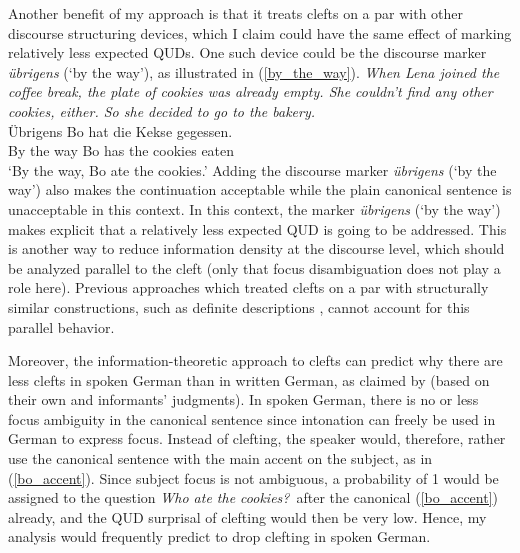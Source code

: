 \documentclass[output=paper,colorlinks,citecolor=brown]{langscibook}
\begin{document}
Another benefit of my approach is that it treats clefts on a par with other discourse structuring devices, which I claim could have the same effect of marking relatively less expected QUDs. One such device could be the discourse marker \textit{übrigens} (`by the way'), as illustrated in (\ref{by_the_way}).
\ea\label{by_the_way} \textit{When Lena joined the coffee break, the plate of cookies was already empty. She couldn't find any other cookies, either. So she decided to go to the bakery.}\\\vspace{1ex}
\gll Übrigens Bo hat die Kekse gegessen.\\
{By the way} Bo has the cookies eaten\\
\glt `By the way, Bo ate the cookies.'
\z
\largerpage
Adding the discourse marker \textit{übrigens} (`by the way') also makes the continuation acceptable while the plain canonical sentence is unacceptable in this context. In this context, the marker \textit{übrigens} (`by the way') makes explicit that a relatively less expected QUD is going to be addressed. This is another way to reduce information density at the discourse level, which should be analyzed parallel to the cleft (only that focus disambiguation does not play a role here). Previous approaches which treated clefts on a par with structurally similar constructions, such as definite descriptions \citep{percus_1997}, cannot account for this parallel behavior.

Moreover, the information-theoretic approach to clefts can predict why there are less clefts in spoken German than in written German, as claimed by \citet{tonnis_et_al_2018} (based on their own and informants' judgments). In spoken German, there is no or less focus ambiguity in the canonical sentence since intonation can freely be used in German to express focus. Instead of clefting, the speaker would, therefore, rather use the canonical sentence with the main accent on the subject, as in (\ref{bo_accent}).
\z
%
Since subject focus is not ambiguous, a probability of 1 would be assigned to the question \textit{Who ate the cookies?}~after the canonical (\ref{bo_accent}) already, and the QUD surprisal of clefting would then be very low. Hence, my analysis would frequently predict to drop clefting in spoken German.
\end{document}
